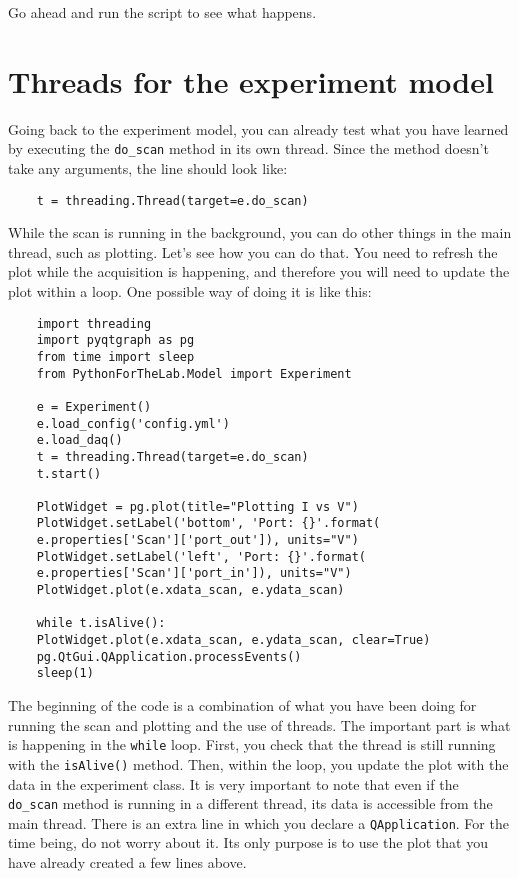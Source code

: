 Go ahead and run the script to see what happens.


\section{Threads for the experiment model}\label{threads-for-the-experimentmodel}

Going back to the experiment model, you can already test what you have
learned by executing the \texttt{do_scan} method in its own thread.
Since the method doesn't take any arguments, the line should look like:

\begin{verbatim}
    t = threading.Thread(target=e.do_scan)
\end{verbatim}

While the scan is running in the background, you can do other things in
the main thread, such as plotting. Let's see how you can do that. You
need to refresh the plot while the acquisition is happening, and
therefore you will need to update the plot within a loop. One possible
way of doing it is like this:

\begin{verbatim}
    import threading
    import pyqtgraph as pg
    from time import sleep
    from PythonForTheLab.Model import Experiment

    e = Experiment()
    e.load_config('config.yml')
    e.load_daq()
    t = threading.Thread(target=e.do_scan)
    t.start()

    PlotWidget = pg.plot(title="Plotting I vs V")
    PlotWidget.setLabel('bottom', 'Port: {}'.format(
    e.properties['Scan']['port_out']), units="V")
    PlotWidget.setLabel('left', 'Port: {}'.format(
    e.properties['Scan']['port_in']), units="V")
    PlotWidget.plot(e.xdata_scan, e.ydata_scan)

    while t.isAlive():
    PlotWidget.plot(e.xdata_scan, e.ydata_scan, clear=True)
    pg.QtGui.QApplication.processEvents()
    sleep(1)
\end{verbatim}

The beginning of the code is a combination of what you have been doing
for running the scan and plotting and the use of threads. The important
part is what is happening in the \texttt{while} loop. First, you check
that the thread is still running with the \texttt{isAlive()} method.
Then, within the loop, you update the plot with the data in the
experiment class. It is very important to note that even if the
\texttt{do_scan} method is running in a different thread, its data is
accessible from the main thread. There is an extra line in which you
declare a \texttt{QApplication}. For the time being, do not worry about
it. Its only purpose is to use the plot that you have already created a
few lines above.

